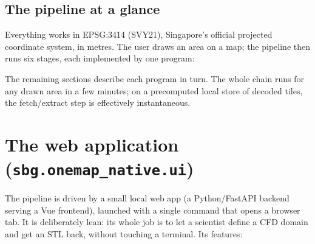 \documentclass[11pt]{article}
\newcommand{\code}[1]{\texttt{#1}}
\begin{document}
\subsection{The pipeline at a glance}

Everything works in EPSG:3414 (SVY21), Singapore's official projected coordinate system, in
metres. The user draws an area on a map; the pipeline then runs six stages, each implemented by
one program:

\begin{center}
\end{center}

The remaining sections describe each program in turn. The whole chain runs for any drawn area
in a few minutes; on a precomputed local store of decoded tiles, the fetch/extract step is
effectively instantaneous.

\section{The web application (\code{sbg.onemap\_native.ui})}
\label{sec:ui}

The pipeline is driven by a small local web app (a Python/FastAPI backend serving a Vue
frontend), launched with a single command that opens a browser tab. It is deliberately lean:
its whole job is to let a scientist define a CFD domain and get an STL back, without touching a
terminal. Its features:
\end{document}
